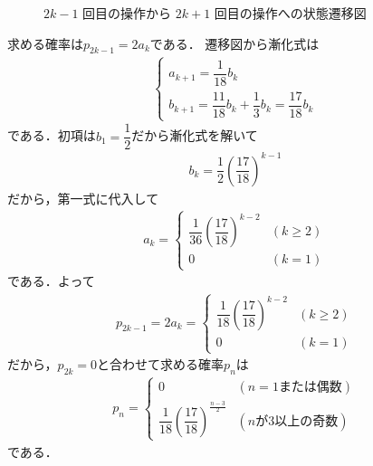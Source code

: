 \documentclass[../../main.tex]{subfiles}
\begin{document}
\begin{figure}[htb]
  \caption{$2k-1$ 回目の操作から $2k+1$ 回目の操作への状態遷移図}
  \label{fig:state_transition_n6}
\end{figure}

求める確率は$p_{2k-1}=2a_{k}$である．
遷移図から漸化式は
\begin{align}
  \begin{cases}
    a_{k+1} = \dfrac{1}{18} b_k \\
    b_{k+1} = \dfrac{11}{18} b_k + \dfrac{1}{3} b_k = \dfrac{17}{18} b_k
  \end{cases}
\end{align}
である．初項は$b_1=\dfrac{1}{2}$だから漸化式を解いて
\begin{align}
  b_k = \dfrac{1}{2}\left(\dfrac{17}{18}\right)^{k-1}
\end{align}
だから，第一式に代入して
\begin{align}
  a_k =
  \begin{cases}
    \dfrac{1}{36}\left(\dfrac{17}{18}\right)^{k-2} & (k \ge 2) \\
    0 & (k=1)
  \end{cases}
\end{align}
である．よって
\begin{align}
  p_{2k-1} = 2a_k =
  \begin{cases}
    \dfrac{1}{18}\left(\dfrac{17}{18}\right)^{k-2} & (k \ge 2) \\
    0 & (k=1)
  \end{cases}
\end{align}
だから，$p_{2k}=0$と合わせて求める確率$p_n$は
\begin{align}
  p_n =
  \begin{cases}
    0 & (n=1\text{または偶数}) \\
    \dfrac{1}{18}\left(\dfrac{17}{18}\right)^{\frac{n-3}{2}} & (n \text{が3以上の奇数})
  \end{cases}
\end{align}
である．
\end{document}

